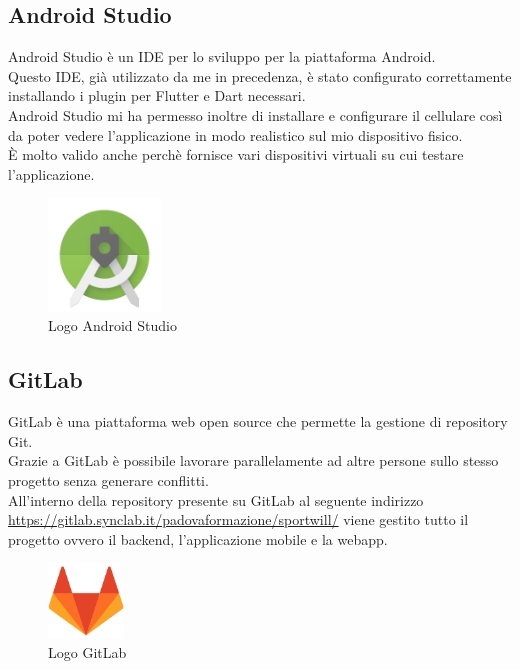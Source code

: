 \subsection{Android Studio}
Android Studio è un IDE per lo sviluppo per la piattaforma Android.\\
Questo IDE, già utilizzato da me in precedenza, è stato configurato correttamente installando i plugin per Flutter e Dart necessari.\\
Android Studio mi ha permesso inoltre di installare e configurare il cellulare così da poter vedere l'applicazione in modo realistico sul mio dispositivo fisico.\\
È molto valido anche perchè fornisce vari dispositivi virtuali su cui testare l'applicazione.

\begin{figure}[htbp]	
	\centering
	\includegraphics[width=3cm]{immagini/logoandroidstudio.png}
	\caption{Logo Android Studio}
	\label{fig:Logo Android Studio}
\end{figure}

\subsection{GitLab}
GitLab è una piattaforma web open source che permette la gestione di repository Git.\\
Grazie a GitLab è possibile lavorare parallelamente
ad altre persone sullo stesso progetto senza generare conflitti.\\
All'interno della repository presente su GitLab al seguente indirizzo \url{https://gitlab.synclab.it/padovaformazione/sportwill/} viene gestito tutto il progetto ovvero il backend, l'applicazione mobile e la webapp.\\

\begin{figure}[htbp]	
	\centering
	\includegraphics[width=2cm]{immagini/logogitlab.png}
	\caption{Logo GitLab}
	\label{fig:Logo GitLab}\end{figure}

